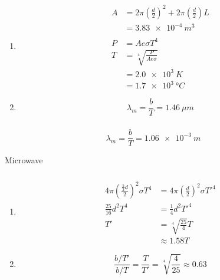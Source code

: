 \documentclass{article}
\begin{document}
\begin{enumerate}
  \item

        \begin{align*}
          A & = 2 \pi \left( \frac{d}{2} \right)^2 + 2 \pi \left( \frac{d}{2} \right) L \\
            & = \qty{3.83e-4}{m^3}                                                      \\ \\
          P & = A e \sigma T^4                                                          \\
          T & = \sqrt[4]{\frac{P}{A e \sigma}}                                          \\
            & = \qty{2.0e3}{K}                                                          \\
            & = \qty{1.7e3}{\degree C}
        \end{align*}

  \item \[\lambda_m = \frac{b}{T} = \qty{1.46}{\mu m}\]
\end{enumerate}

\setcounter{subsubsection}{38}
\subsubsection{}

\[\lambda_m = \frac{b}{T} = \qty{1.06e-3}{m}\]

Microwave

\setcounter{subsubsection}{40}
\subsubsection{}

\begin{enumerate}
  \item

        \begin{align*}
          4 \pi \left( \frac{\frac{5}{2} d}{2} \right)^2 \sigma T^4 & = 4 \pi \left( \frac{d}{2} \right)^2 \sigma T'^4 \\
          \frac{25}{16} d^2 T^4                                     & = \frac{1}{4} d^2 T'^4                           \\
          T'                                                        & = \sqrt[4]{\frac{25}{4}} T                       \\
                                                                    & \approx 1.58 T
        \end{align*}

  \item \[\frac{b / T'}{b / T} = \frac{T}{T'} = \sqrt[4]{\frac{4}{25}} \approx 0.63\]
\end{enumerate}
\end{document}
